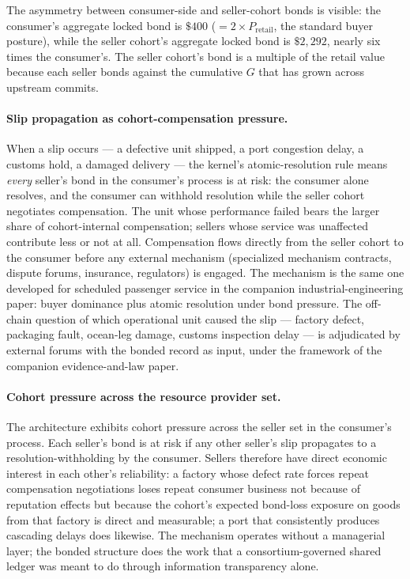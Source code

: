 \documentclass[11pt,a4paper]{article}
\theoremstyle{definition}
\theoremstyle{remark}
\begin{document}
The asymmetry between consumer-side and seller-cohort bonds is
visible: the consumer's aggregate locked bond is $\$400$
($= 2 \times P_{\text{retail}}$, the standard buyer posture),
while the seller cohort's aggregate locked bond is $\$2{,}292$,
nearly six times the consumer's. The seller cohort's bond is a
multiple of the retail value because each seller bonds against
the cumulative $G$ that has grown across upstream commits.

\paragraph{Slip propagation as cohort-compensation pressure.}
When a slip occurs --- a defective unit shipped, a port
congestion delay, a customs hold, a damaged delivery --- the
kernel's atomic-resolution rule means \emph{every} seller's bond
in the consumer's process is at risk: the consumer alone
resolves, and the consumer can withhold resolution while the
seller cohort negotiates compensation. The unit whose performance
failed bears the larger share of cohort-internal compensation;
sellers whose service was unaffected contribute less or not at
all. Compensation flows directly from the seller cohort to the
consumer before any external mechanism (specialized mechanism
contracts, dispute forums, insurance, regulators) is engaged.
The mechanism is the same one developed for scheduled passenger
service in the companion industrial-engineering paper: buyer
dominance plus atomic resolution under bond pressure. The
off-chain question of which operational unit caused the slip ---
factory defect, packaging fault, ocean-leg damage, customs
inspection delay --- is adjudicated by external forums with the
bonded record as input, under the framework of the companion
evidence-and-law paper.

\paragraph{Cohort pressure across the resource provider set.}
The architecture exhibits cohort pressure across the seller set
in the consumer's process. Each seller's bond is at risk if any
other seller's slip propagates to a resolution-withholding by the
consumer. Sellers therefore have direct economic interest in
each other's reliability: a factory whose defect rate forces
repeat compensation negotiations loses repeat consumer business
not because of reputation effects but because the cohort's
expected bond-loss exposure on goods from that factory is direct
and measurable; a port that consistently produces cascading
delays does likewise. The mechanism operates without a
managerial layer; the bonded structure does the work that a
consortium-governed shared ledger was meant to do through
information transparency alone.
\end{document}
